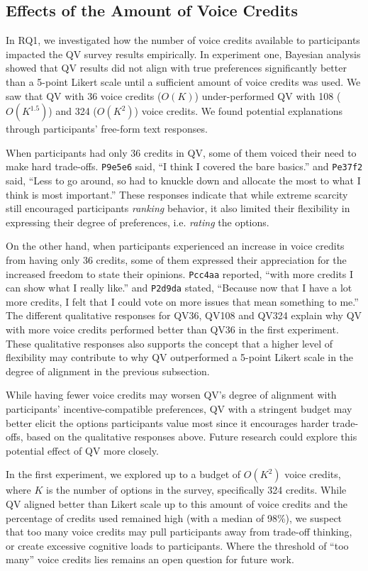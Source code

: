 \subsection{Effects of the Amount of Voice Credits}
In RQ1, we investigated how the number of voice credits available to participants impacted the QV survey results empirically. In experiment one, Bayesian analysis showed that QV results did not align with true preferences significantly better than a 5-point Likert scale until a sufficient amount of voice credits was used. We saw that QV with 36 voice credits ($O(K)$) under-performed QV with 108 ($O(K^{1.5})$) and 324 ($O(K^{2})$) voice credits. We found potential explanations through participants' free-form text responses. 

When participants had only 36 credits in QV, some of them voiced their need to make hard trade-offs. \texttt{P9e5e6} said, ``I think I covered the bare basics.'' and \texttt{Pe37f2} said, ``Less to go around, so had to knuckle down and allocate the most to what I think is most important.'' These responses indicate that while extreme scarcity still encouraged participants \textit{ranking} behavior, it also limited their flexibility in expressing their degree of preferences, i.e. \textit{rating} the options.

On the other hand, when participants experienced an increase in voice credits from having only 36 credits, some of them expressed their appreciation for the increased freedom to state their opinions. \texttt{Pcc4aa} reported, ``with more credits I can show what I really like.'' and \texttt{P2d9da} stated, ``Because now that I have a lot more credits, I felt that I could vote on more issues that mean something to me.'' The different qualitative responses for QV36, QV108 and QV324 explain why QV with more voice credits performed better than QV36 in the first experiment. These qualitative responses also supports the concept that a higher level of flexibility may contribute to why QV outperformed a 5-point Likert scale in the degree of alignment in the previous subsection. 

While having fewer voice credits may worsen QV's degree of alignment with participants' incentive-compatible preferences, QV with a stringent budget may better elicit the options participants value most since it encourages harder trade-offs, based on the qualitative responses above. Future research could explore this potential effect of QV more closely.

In the first experiment, we explored up to a budget of $O(K^{2})$ voice credits, where $K$ is the number of options in the survey, specifically 324 credits. While QV aligned better than Likert scale up to this amount of voice credits and the percentage of credits used remained high (with a median of 98\%), we suspect that too many voice credits may pull participants away from trade-off thinking, or create excessive cognitive loads to participants. Where the threshold of ``too many'' voice credits lies remains an open question for future work.

